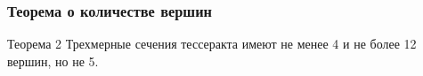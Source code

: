 \documentclass[10pt,pdf,hyperref={unicode}]{beamer}
\begin{document}
\begin{frame}
	\frametitle{Теорема о количестве вершин}
	\begin{block}{Теорема 2}
		Трехмерные сечения тессеракта имеют не менее 4 и не более 12 вершин, но не 5.
	\end{block}
	\begin{columns}
	\end{columns}
\end{frame}
\end{document}
